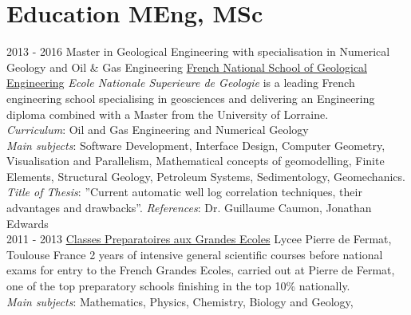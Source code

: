 \documentclass[]{friggeri-cv}
\begin{document}
\section{Education MEng, MSc}
\begin{entrylist}
  \entry
    {2013 - 2016}
    {Master in Geological Engineering with specialisation in Numerical Geology and Oil \& Gas Engineering}
    {\href{http://ensg.univ-lorraine.fr/english/}{French National School of Geological Engineering}}
    {\emph{Ecole Nationale Superieure de Geologie} is a leading French engineering school specialising in geosciences and delivering an Engineering diploma combined with a Master from the University of Lorraine.\\ \emph{Curriculum}: Oil and Gas Engineering and Numerical Geology\\ 
    \emph{Main subjects}:  Software Development, Interface Design, Computer Geometry, Visualisation and Parallelism, Mathematical concepts of geomodelling, Finite Elements, Structural Geology, Petroleum Systems, Sedimentology, Geomechanics.\\
    \emph{Title of Thesis}: ”Current automatic well log correlation techniques, their advantages and drawbacks”.
    \emph{References}: Dr. Guillaume Caumon, Jonathan Edwards\\}
  \entry
    {2011 - 2013}
    {\href{https://en.wikipedia.org/wiki/Classe_preparatoire_aux_grandes_ecoles}{Classes Preparatoires aux Grandes Ecoles}}
    {Lycee Pierre de Fermat, Toulouse France}
    {2 years of intensive general scientific courses before national exams for entry to the French Grandes Ecoles, carried out at Pierre de Fermat, one of the top preparatory schools finishing in the top 10\% nationally.\\ 
    \emph{Main subjects}: Mathematics, Physics, Chemistry, Biology and Geology, \\}
\end{entrylist}
\vspace*{\fill}
\end{document}
